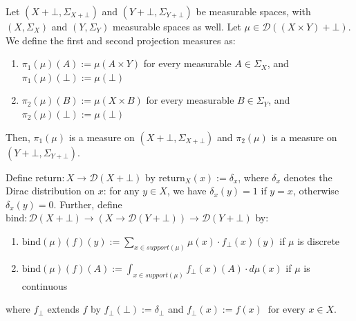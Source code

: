 
\begin{definition}
	Let $(X + \bot, \Sigma_{X + \bot})$ and $(Y + \bot, \Sigma_{Y + \bot})$ be measurable spaces, with $(X, \Sigma_X)$ and $(Y, \Sigma_Y)$ measurable spaces as well. Let $\mu \in \mathcal{D}((X \times Y) + \bot)$. We define the first and second projection measures as:
	\begin{enumerate}
	\item $\pi_1(\mu)(A) := \mu(A \times Y)$ for every measurable $A \in \Sigma_X$, and $\pi_1(\mu)({\bot}) := \mu({\bot})$
	\item $\pi_2(\mu)(B) := \mu(X \times B)$ for every measurable $B \in \Sigma_Y$, and $\pi_2(\mu)({\bot}) := \mu({\bot})$
	\end{enumerate}
	Then, $\pi_1(\mu)$ is a measure on $(X + \bot, \Sigma_{X + \bot})$ and $\pi_2(\mu)$ is a measure on $(Y + \bot, \Sigma_{Y + \bot})$.
\end{definition}

\begin{definition}
	Define $\text{return} : X \to \mathcal{D}(X + \bot)$ by $\text{return}_X(x) := \delta_x$, where $\delta_x$ denotes the Dirac distribution on $x$: for any $y \in X$, we have $\delta_x(y) = 1$ if $y = x$, otherwise $\delta_x(y) = 0$. Further, define $\text{bind} : \mathcal{D}(X + \bot) \to (X \to \mathcal{D}(Y + \bot)) \to \mathcal{D}(Y + \bot)$ by:
	\begin{enumerate}
		\item $\text{bind}(\mu)(f)(y) := \sum_{x \in support(\mu)} \mu(x) \cdot f_{\bot}(x)(y)$ if $\mu$ is discrete
		\item $\text{bind}(\mu)(f)(A) := \int_{x \in support(\mu)} f_{\bot}(x)(A) \cdot d\mu(x)$ if $\mu$ is continuous
	\end{enumerate}
	where $f_{\bot}$ extends $f$ by $f_{\bot}(\bot) := \delta_{\bot}$ and $f_{\bot}(x) := f(x) \;\; \text{for every } x \in X.$
\end{definition}

